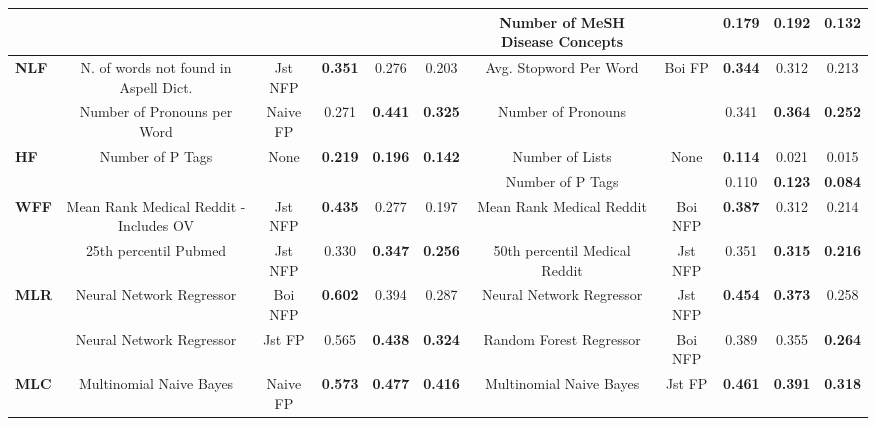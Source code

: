 \begin{table*}[t]
{\begin{tabular}{l|ccccc|ccccc}
 &  &  &  &  &  & Number of MeSH Disease Concepts  &  & 0.179  & \textbf{0.192}  & \textbf{0.132}\tabularnewline
\midrule 
\multirow{2}{*}{\textbf{NLF}} & N. of words not found in Aspell Dict.  & Jst NFP  & \textbf{0.351}  & 0.276  & 0.203 & Avg. Stopword Per Word  & \multirow{2}{*}{Boi FP } & \textbf{0.344}  & 0.312  & 0.213\tabularnewline
 & Number of Pronouns per Word  & Naive FP  & 0.271  & \textbf{0.441}  & \textbf{0.325} & Number of Pronouns  &  & 0.341  & \textbf{0.364}  & \textbf{0.252}\tabularnewline
\midrule 
\multirow{2}{*}{\textbf{HF}} & \multirow{2}{*}{Number of P Tags } & \multirow{2}{*}{None } & \multirow{2}{*}{\textbf{0.219} } & \multirow{2}{*}{\textbf{0.196} } & \multirow{2}{*}{\textbf{0.142}} & Number of Lists  & \multirow{2}{*}{None} & \textbf{0.114}  & 0.021  & 0.015\tabularnewline
 &  &  &  &  &  & Number of P Tags  &  & 0.110  & \textbf{0.123}  & \textbf{0.084}\tabularnewline
\midrule 
\multirow{2}{*}{\textbf{WFF}} & Mean Rank Medical Reddit - Includes OV  & Jst NFP  & \textbf{0.435}  & 0.277  & 0.197 & Mean Rank Medical Reddit  & Boi NFP  & \textbf{0.387}  & 0.312  & 0.214\tabularnewline
 & 25th percentil Pubmed  & Jst NFP  & 0.330  & \textbf{0.347}  & \textbf{0.256} & 50th percentil Medical Reddit  & Jst NFP  & 0.351  & \textbf{0.315}  & \textbf{0.216}\tabularnewline
\midrule 
\multirow{2}{*}{\textbf{MLR}} & Neural Network Regressor  & Boi NFP  & \textbf{0.602}  & 0.394  & 0.287 & Neural Network Regressor  & Jst NFP  & \textbf{0.454}  & \textbf{0.373}  & 0.258\tabularnewline
 & Neural Network Regressor  & Jst FP  & 0.565  & \textbf{0.438}  & \textbf{0.324} & Random Forest Regressor  & Boi NFP  & 0.389  & 0.355  & \textbf{0.264}\tabularnewline
\midrule 
\textbf{MLC} & Multinomial Naive Bayes  & Naive FP  & \textbf{0.573}  & \textbf{0.477}  & \textbf{0.416} & Multinomial Naive Bayes  & Jst FP  & \textbf{0.461}  & \textbf{0.391}  & \textbf{0.318}\tabularnewline
\bottomrule
\end{tabular}
} %
\end{table*}
